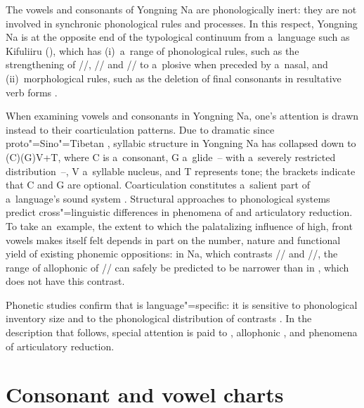 The vowels and consonants of Yongning Na are phonologically inert:
they are not involved in synchronic phonological rules and processes. In this respect, Yongning Na
is at the opposite end of the typological continuum from a~language such as Kifuliiru (), which
has (i)~a~range of phonological rules, such as the strengthening of //, // and
// to a~plosive when preceded by a~nasal, 
and (ii)~morphological rules, such as the
deletion of final consonants in {resultative} verb forms \citep[37--96]{vanotterloo2011}.

When examining vowels and consonants in Yongning Na, one's attention is drawn instead to their {coarticulation} patterns. Due to dramatic  since proto"=Sino"=Tibetan \citep{jacquesetal2011}, syllabic structure in
Yongning Na has collapsed down to (C)(G)V+T, where C is a~consonant, G a~glide~-- with a~severely restricted
distribution~--, V a~syllable nucleus, and T represents tone; the brackets indicate that C and G are
optional. Coarticulation constitutes a~salient part of a~language’s sound system \citep{keating1990, kuhnertetal1999}. Structural
approaches to phonological systems predict cross"=linguistic differences in phenomena of
 and articulatory reduction. To take an~example, the extent to which the palatalizing
influence of high, front vowels makes itself felt depends in part on the number, nature and
functional yield of existing phonemic oppositions: in Na, which contrasts // and
//, the range of allophonic  of // can safely be predicted to be narrower
than in , which does not have this contrast.

Phonetic studies confirm that  is language"=specific: it is sensitive to phonological
inventory size and to the phonological distribution of contrasts \citep[162]{dicanio2012}. In the description that follows,
special attention is paid to , allophonic , and phenomena of
articulatory reduction. 


\section{Consonant and vowel charts}
\label{sec:ConsonantAndVowelChart}

